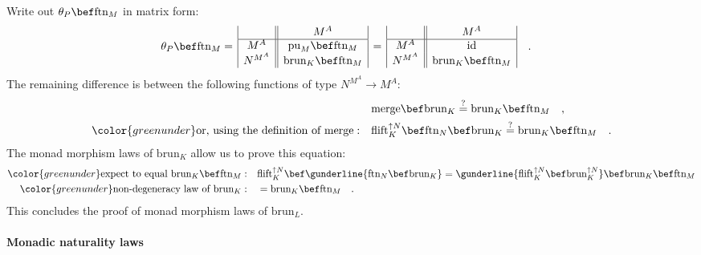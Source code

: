 Write out $\theta_{P}\bef\text{ftn}_{M}$ in matrix form:
\begin{align*}
 & \theta_{P}\bef\text{ftn}_{M}=\,\begin{array}{|c||c|}
 & M^{A}\\
\hline M^{A} & \text{pu}_{M}\bef\text{ftn}_{M}\\
N^{M^{A}} & \text{brun}_{K}\bef\text{ftn}_{M}
\end{array}\,=\,\begin{array}{|c||c|}
 & M^{A}\\
\hline M^{A} & \text{id}\\
N^{M^{A}} & \text{brun}_{K}\bef\text{ftn}_{M}
\end{array}\quad.
\end{align*}
The remaining difference is between the following functions of type
$N^{M^{A}}\rightarrow M^{A}$:
\begin{align*}
 & \text{merge}\bef\text{brun}_{K}\overset{?}{=}\text{brun}_{K}\bef\text{ftn}_{M}\quad,\\
{\color{greenunder}\text{or, using the definition of }\text{merge}:}\quad & \text{flift}_{K}^{\uparrow N}\bef\text{ftn}_{N}\bef\text{brun}_{K}\overset{?}{=}\text{brun}_{K}\bef\text{ftn}_{M}\quad.
\end{align*}
The monad morphism laws of $\text{brun}_{K}$ allow us to prove this
equation:
\begin{align*}
{\color{greenunder}\text{expect to equal }\text{brun}_{K}\bef\text{ftn}_{M}:}\quad & \text{flift}_{K}^{\uparrow N}\bef\gunderline{\text{ftn}_{N}\bef\text{brun}_{K}}=\gunderline{\text{flift}_{K}^{\uparrow N}\bef\text{brun}_{K}^{\uparrow N}}\bef\text{brun}_{K}\bef\text{ftn}_{M}\\
{\color{greenunder}\text{non-degeneracy law of }\text{brun}_{K}:}\quad & =\text{brun}_{K}\bef\text{ftn}_{M}\quad.
\end{align*}
This concludes the proof of monad morphism laws of $\text{brun}_{L}$.


\paragraph{Monadic naturality laws}

